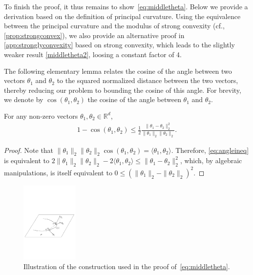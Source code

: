 \documentclass[english]{article}
\newcommand{\real}{\mathbb{R}}
\newcommand{\inpro}[2]{\langle #1, #2\rangle}
\newcommand{\inangle}[2]{(#1,#2)}
\newenvironment{proofof}[1]{\par\noindent{\bf Proof of #1\ }}{\hfill\BlackBox\\[2mm]}
\begin{document}
\begin{proofof}{\cref{thm:R_curvesurface}}
To finish the proof, it thus remains to show~\eqref{eq:middletheta}. Below we provide a derivation based on the definition of principal curvature.
Using the equivalence between the principal curvature and the modulus of strong convexity (cf., \cref{prop:strongconvex}), we also provide an alternative proof in \cref{app:stronglyconvexity} based on strong convexity, which leads to the slightly weaker result \eqref{middletheta2}, loosing a constant factor of 4. %


The following elementary lemma relates the cosine of the angle between two vectors $\theta_1$ and $\theta_2$ to the squared normalized distance between 
the two vectors, thereby reducing our problem to bounding the cosine of this angle.
For brevity, we denote by $\cos\inangle{\theta_1}{\theta_2}$
the cosine of the angle between $\theta_1$ and $\theta_2$. 
\begin{lemma}
\label{lem:upperboundcos}
For any non-zero vectors $\theta_1, \theta_2 \in \real^d$,
\begin{align}
1- \cos \inangle{\theta_1}{\theta_2} \le \frac{1}{2} \frac{\|\theta_1 - \theta_2\|_2^2}{\|\theta_1\|_2\|\theta_2\|_2}.
\label{eq:angleineq}
\end{align}
\end{lemma}
\begin{proof}
Note that $\|\theta_1\|_2\|\theta_2\|_2\cos\inangle{\theta_1}{\theta_2} = \inpro{\theta_1}{\theta_2}$.
Therefore, \eqref{eq:angleineq} is equivalent to 
$ 2\|\theta_1\|_2\|\theta_2\|_2 - 2\inpro{\theta_1}{\theta_2} \le \|\theta_1 - \theta_2\|_2^2 $,
which, by algebraic manipulations, is itself equivalent to $0 \le (\|\theta_1\|_2-\|\theta_2\|_2)^2$.
\end{proof}



\begin{figure}[h]
  \centering
	\includegraphics[height=4cm]{figures/GaussmapPro}
  \caption{Illustration of the construction used in the proof of~\eqref{eq:middletheta}.} 
  \label{fig:cuttingplane}
\end{figure}



\end{proofof}
\end{document}
